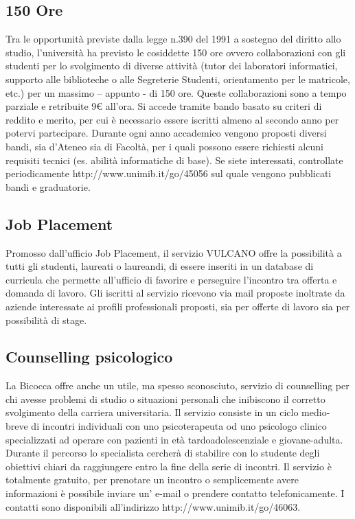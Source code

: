 \subsection{150 Ore}
Tra le opportunità previste dalla legge n.390 del 1991 a sostegno del diritto allo studio, l'università ha previsto le cosiddette 150 ore ovvero collaborazioni con gli studenti per lo svolgimento di diverse attività (tutor dei laboratori informatici, supporto alle biblioteche o alle Segreterie Studenti, orientamento per le matricole, etc.) per un massimo – appunto - di 150 ore. Queste collaborazioni sono a tempo parziale e retribuite 9€ all'ora. Si accede tramite bando basato su criteri di reddito e merito, per cui è necessario essere iscritti almeno al secondo anno per potervi partecipare. Durante ogni anno accademico vengono proposti diversi bandi, sia d'Ateneo sia di Facoltà, per i quali possono essere richiesti alcuni requisiti tecnici (es. abilità informatiche di base). Se siete interessati, controllate periodicamente http://www.unimib.it/go/45056 sul quale vengono pubblicati bandi e graduatorie. 

\subsection{Job Placement}
Promosso dall'ufficio Job Placement, il servizio VULCANO offre la possibilità a tutti gli studenti, laureati o laureandi, di essere inseriti in un database di curricula che permette all'ufficio di favorire e perseguire l'incontro tra offerta e domanda di lavoro. Gli iscritti al servizio ricevono via mail proposte inoltrate da aziende interessate ai profili professionali proposti, sia per offerte di lavoro sia per possibilità di stage. 

\subsection{Counselling psicologico}
La Bicocca offre anche un utile, ma spesso sconosciuto, servizio di counselling per chi avesse problemi di studio o situazioni personali che inibiscono il corretto svolgimento della carriera universitaria. Il servizio consiste in un ciclo medio-breve di incontri individuali con uno psicoterapeuta od uno psicologo clinico specializzati ad operare con pazienti in età tardoadolescenziale e giovane-adulta. Durante il percorso lo specialista cercherà di stabilire con lo studente degli obiettivi chiari da raggiungere entro la fine della serie di incontri. 
Il servizio è totalmente gratuito, per prenotare un incontro o semplicemente avere informazioni è possibile inviare un' e-mail o prendere contatto telefonicamente. I contatti sono disponibili all'indirizzo http://www.unimib.it/go/46063.

